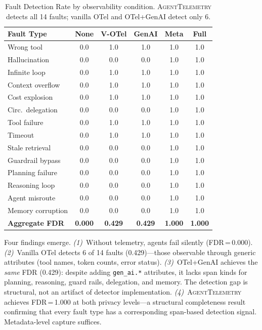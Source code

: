 \documentclass[sigconf,screen]{acmart}
\begin{document}
\begin{table}[t]
\centering
\scriptsize
\caption{Fault Detection Rate by observability condition.
\textsc{AgentTelemetry} detects all 14 faults; vanilla OTel and
OTel+GenAI detect only 6.}
\label{tab:fdr}
\begin{tabular}{@{}lccccc@{}}
\toprule
\textbf{Fault Type} & \textbf{None} & \textbf{V-OTel} & \textbf{GenAI} & \textbf{Meta} & \textbf{Full} \\
\midrule
Wrong tool          & 0.0 & 1.0 & 1.0 & 1.0 & 1.0 \\
Hallucination       & 0.0 & 0.0 & 0.0 & 1.0 & 1.0 \\
Infinite loop       & 0.0 & 1.0 & 1.0 & 1.0 & 1.0 \\
Context overflow    & 0.0 & 1.0 & 1.0 & 1.0 & 1.0 \\
Cost explosion      & 0.0 & 1.0 & 1.0 & 1.0 & 1.0 \\
Circ.\ delegation   & 0.0 & 0.0 & 0.0 & 1.0 & 1.0 \\
Tool failure        & 0.0 & 1.0 & 1.0 & 1.0 & 1.0 \\
Timeout             & 0.0 & 1.0 & 1.0 & 1.0 & 1.0 \\
\midrule
Stale retrieval     & 0.0 & 0.0 & 0.0 & 1.0 & 1.0 \\
Guardrail bypass    & 0.0 & 0.0 & 0.0 & 1.0 & 1.0 \\
Planning failure    & 0.0 & 0.0 & 0.0 & 1.0 & 1.0 \\
Reasoning loop      & 0.0 & 0.0 & 0.0 & 1.0 & 1.0 \\
Agent misroute      & 0.0 & 0.0 & 0.0 & 1.0 & 1.0 \\
Memory corruption   & 0.0 & 0.0 & 0.0 & 1.0 & 1.0 \\
\midrule
\textbf{Aggregate FDR} & \textbf{0.000} & \textbf{0.429} & \textbf{0.429} & \textbf{1.000} & \textbf{1.000} \\
\bottomrule
\end{tabular}
\end{table}

Four findings emerge.
\emph{(1)}~Without telemetry, agents fail silently (FDR\,=\,0.000).
\emph{(2)}~Vanilla OTel detects 6 of 14 faults (0.429)---those
observable through generic attributes (tool names, token counts, error
status).
\emph{(3)}~OTel+GenAI achieves the \emph{same} FDR (0.429): despite
adding \texttt{gen\_ai.*} attributes, it lacks span kinds for planning,
reasoning, guard rails, delegation, and memory.  The detection gap is
structural, not an artifact of detector implementation.
\emph{(4)}~\textsc{AgentTelemetry} achieves FDR\,=\,1.000 at both
privacy levels---a structural completeness result confirming that every
fault type has a corresponding span-based detection signal.
Metadata-level capture suffices.
\end{document}
